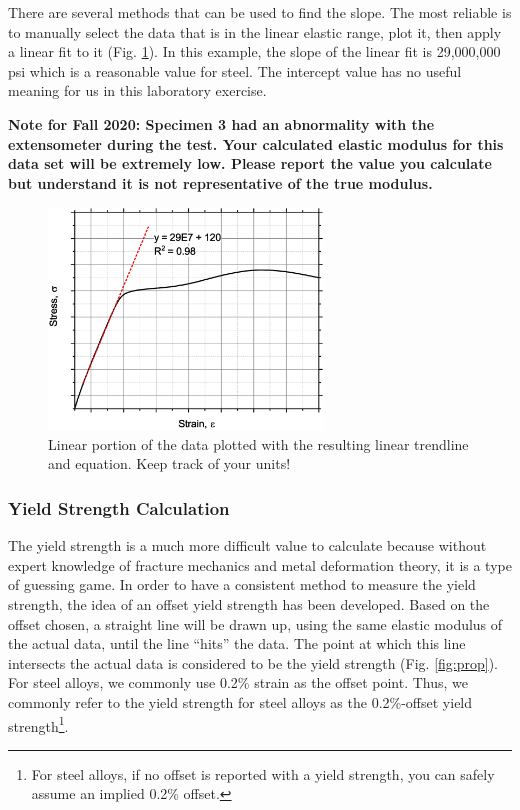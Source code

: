 \documentclass[12pt]{article}
\begin{document}
There are several methods that can be used to find the slope. The most reliable is to manually select the data that is in the linear elastic range, plot it, then apply a linear fit to it (Fig. \ref{fig:trend}). In this example, the slope of the linear fit is 29,000,000 psi which is a reasonable value for steel. The intercept value has no useful meaning for us in this laboratory exercise.

\textbf{Note for Fall 2020: Specimen 3 had an abnormality with the extensometer during the test. Your calculated elastic modulus for this data set will be extremely low. Please report the value you calculate but understand it is not representative of the true modulus.}

\begin{figure}[h!]
    \centering
    \includegraphics[width=0.65\textwidth]{offset4.eps}
    \caption{Linear portion of the data plotted with the resulting linear trendline and equation. Keep track of your units!}
    \label{fig:trend}
\end{figure}

\subsubsection{Yield Strength Calculation}
The yield strength is a much more difficult value to calculate because without expert knowledge of fracture mechanics and metal deformation theory, it is a type of guessing game. In order to have a consistent method to measure the yield strength, the idea of an offset yield strength has been developed. Based on the offset chosen, a straight line will be drawn up, using the same elastic modulus of the actual data, until the line ``hits'' the data. The point at which this line intersects the actual data is considered to be the yield strength (Fig. \ref{fig:prop}). For steel alloys, we commonly use 0.2\% strain as the offset point. Thus, we commonly refer to the yield strength for steel alloys as the 0.2\%-offset yield strength\footnote{For steel alloys, if no offset is reported with a yield strength, you can safely assume an implied 0.2\% offset.}.
\end{document}
